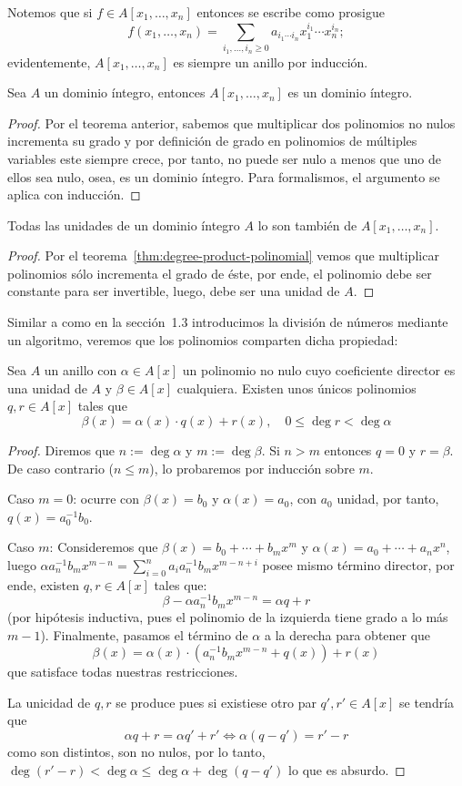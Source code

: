 \documentclass[11pt,oneside]{book}
\begin{document}
Notemos que si $f\in A[x_1,\dots,x_n]$ entonces se escribe como prosigue
$$f(x_1,\dots,x_n)=\sum_{i_1,\dots,i_n\geq 0}a_{i_1\cdots i_n}x_1^{i_1}\cdots x_n^{i_n};$$
evidentemente, $A[x_1,\dots,x_n]$ es siempre un anillo por inducción.
\begin{thm}
Sea $A$ un dominio íntegro, entonces $A[x_1,\dots,x_n]$ es un dominio íntegro.
\end{thm}
\begin{proof}
Por el teorema anterior, sabemos que multiplicar dos polinomios no nulos incrementa su grado y por definición de grado en polinomios de múltiples variables este siempre crece, por tanto, no puede ser nulo a menos que uno de ellos sea nulo, osea, es un dominio íntegro. Para formalismos, el argumento se aplica con inducción.
\end{proof}
\begin{thm}
Todas las unidades de un dominio íntegro $A$ lo son también de $A[x_1,\dots,x_n]$.
\end{thm}
\begin{proof}
Por el teorema~\ref{thm:degree-product-polinomial} vemos que multiplicar polinomios sólo incrementa el grado de éste, por ende, el polinomio debe ser constante para ser invertible, luego, debe ser una unidad de $A$.
\end{proof}
Similar a como en la sección~1.3 introducimos la división de números mediante un algoritmo, veremos que los polinomios comparten dicha propiedad:
\begin{thm}
Sea $A$ un anillo con $\alpha\in A[x]$ un polinomio no nulo cuyo coeficiente director es una unidad de $A$ y $\beta\in A[x]$ cualquiera. Existen unos únicos polinomios $q,r\in A[x]$ tales que
$$\beta(x)=\alpha(x)\cdot q(x)+r(x),\quad 0\leq\deg r\lt\deg\alpha$$
\end{thm}
\begin{proof}
Diremos que $n:=\deg\alpha$ y $m:=\deg\beta$. Si $n\gt m$ entonces $q=0$ y $r=\beta$. De caso contrario ($n\leq m$), lo probaremos por inducción sobre $m$.

Caso $m=0$: ocurre con $\beta(x)=b_0$ y $\alpha(x)=a_0$, con $a_0$ unidad, por tanto, $q(x)=a_0^{-1}b_0$.

Caso $m$: Consideremos que $\beta(x)=b_0+\cdots+b_mx^m$ y $\alpha(x)=a_0+\cdots+a_nx^n$, luego $\alpha a_n^{-1}b_mx^{m-n}=\sum_{i=0}^n a_ia_n^{-1}b_m x^{m-n+i}$ posee mismo término director, por ende, existen $q,r\in A[x]$ tales que:
$$\beta-\alpha a_n^{-1}b_mx^{m-n}=\alpha q+r$$
(por hipótesis inductiva, pues el polinomio de la izquierda tiene grado a lo más $m-1$). Finalmente, pasamos el término de $\alpha$ a la derecha para obtener que
$$\beta(x)=\alpha(x)\cdot(a_n^{-1}b_mx^{m-n}+q(x))+r(x)$$
que satisface todas nuestras restricciones.

La unicidad de $q,r$ se produce pues si existiese otro par $q',r'\in A[x]$ se tendría que
$$\alpha q+r=\alpha q'+r'\iff\alpha(q-q')=r'-r$$
como son distintos, son no nulos, por lo tanto, $\deg(r'-r)\lt\deg\alpha\leq\deg\alpha+\deg(q-q')$ lo que es absurdo.
\end{proof}
\end{document}
